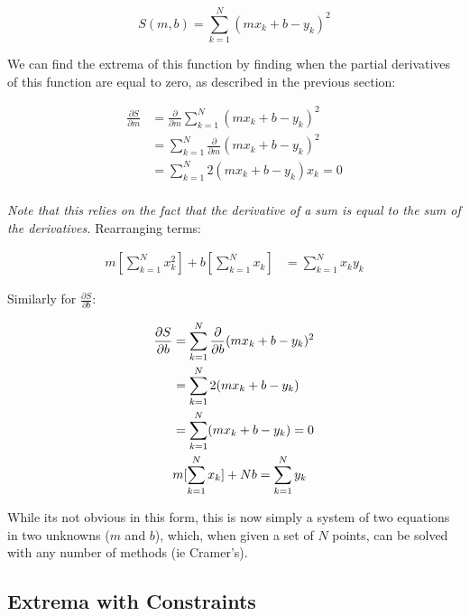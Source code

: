 \documentclass[12pt]{article}
\begin{document}
{\begin{equation}\label{eq:least_squares}
    S(m, b) = \sum_{k=1}^N (mx_k + b - y_k)^2 
\end{equation}

We can find the extrema of this function by finding when the partial derivatives of this function are equal to zero, as described in the previous section:

\begin{align*}
    \frac{\partial S}{\partial m} &= \frac{\partial }{\partial m} \sum_{k=1}^N (mx_k + b - y_k)^2\\
    &= \sum_{k=1}^N \frac{\partial }{\partial m} (mx_k + b - y_k)^2\\
    &= \sum_{k=1}^N 2(mx_k + b - y_k)x_k = 0\\
\end{align*}

\textit{Note that this relies on the fact that the derivative of a sum is equal to the sum of the derivatives.} Rearranging terms:

\begin{align*}
    m[\sum_{k=1}^N x_k^2] + b[\sum_{k=1}^N x_k] &= \sum_{k=1}^N x_k y_k
\end{align*}

Similarly for $\frac{\partial S}{\partial b}$:

\begin{align*}
    \frac{\partial S}{\partial b} &= \sum_{k=1}^N \frac{\partial }{\partial b}(mx_k + b - y_k)^2\\
    &= \sum_{k=1}^N 2(mx_k + b - y_k)\\
    &=\sum_{k=1}^N (mx_k + b - y_k)=0\\
    &m[\sum_{k=1}^N x_k] + Nb = \sum_{k=1}^N y_k
\end{align*}

While its not obvious in this form, this is now simply a system of two equations in two unknowns ($m$ and $b$), which, when given a set of $N$ points, can be solved with any number of methods (ie Cramer's).

\subsection{Extrema with Constraints}

}
\end{document}
